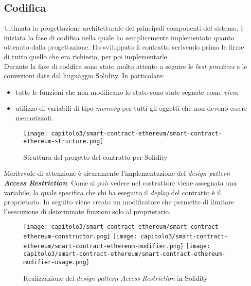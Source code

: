 \subsection{Codifica}
Ultimata la progettazione architetturale dei principali componenti del sistema, è iniziata la fase di codifica nella quale ho semplicemente implementato quanto ottenuto dalla progettazione. Ho sviluppato il contratto scrivendo prima le firme di tutto quello che era richiesto, per poi implementarle. \\

Durante la fase di codifica sono stato molto attento a seguire le \textit{best practices} e le convezioni date dal linguaggio Solidity. In particolare:
\begin{itemize}
  \item tutte le funzioni che non modificano lo stato sono state segnate come \textit{view};
  \item utilizzo di variabili di tipo \textit{memory} per tutti gli oggetti che non devono essere memorizzati.
\end{itemize}

\clearpage

\begin{figure}[h!]
  \centering
  \texttt{[image: capitolo3/smart-contract-ethereum/smart-contract-ethereum-structure.png]}
  \caption{Struttura del progetto del contratto per Solidity}
\end{figure}

Meritevole di attenzione è sicuramente l'implementazione del \textit{design pattern \textbf{Access Restriction}}. Come si può vedere nel costruttore viene assegnata una variabile, la quale specifica che chi ha eseguito il \textit{deploy} del contratto è il proprietario. In seguito viene creato un modificatore che permette di limitare l'esecuzione di determinate funzioni solo al proprietario.

\begin{figure}[h!]
  \centering
  \texttt{[image: capitolo3/smart-contract-ethereum/smart-contract-ethereum-constructor.png]}
  \texttt{[image: capitolo3/smart-contract-ethereum/smart-contract-ethereum-modifier.png]}
  \texttt{[image: capitolo3/smart-contract-ethereum/smart-contract-ethereum-modifier-usage.png]}
  \caption{Realizzazione del \textit{design pattern Access Restriction} in Solidity}
\end{figure}

